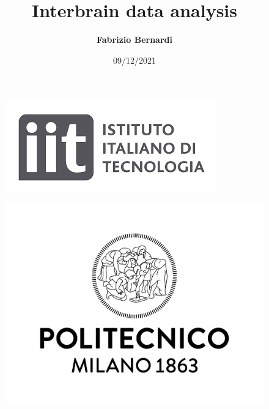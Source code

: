 \documentclass{beamer}
\title{Interbrain data analysis}
\author[F. Bernardi]{\textbf{Fabrizio Bernardi}} \medskip
\date[09/12/2021]{09/12/2021}
\begin{document}
		\begin{frame}
	\maketitle
	
	\begin{minipage}{\linewidth}
		\centering
		\begin{minipage}{0.45\linewidth}
			\begin{figure}[H]
				\includegraphics[width=\linewidth]{Logo_IIT.png}
				
			\end{figure}
		\end{minipage}
		\hspace{0.05\linewidth}
		\begin{minipage}{0.45\linewidth}
			\begin{figure}[H]
				\includegraphics[width=\linewidth]{Logo_Politecnico_Milano.jpg}
				
			\end{figure}
		\end{minipage}
	\end{minipage}
\end{frame}
\end{document}

